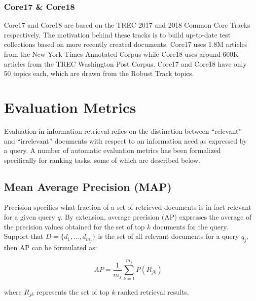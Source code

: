 \subsubsection{Core17 \& Core18}

Core17 and Core18 are based on the TREC 2017 and 2018 Common Core Tracks respectively.
The motivation behind these tracks is to build up-to-date test collections based on more recently created documents.
Core17 uses 1.8M articles from the New York Times Annotated Corpus
while Core18 uses around 600K articles from the TREC Washington Post Corpus.
Core17 and Core18 have only 50 topics each, which are drawn from the Robust Track topics.

\section{Evaluation Metrics}

Evaluation in information retrieval relies on the distinction between ``relevant'' and ``irrelevant'' documents with respect to an information need as expressed by a query.
A number of automatic evaluation metrics has been formalized specifically for ranking tasks, some of which are described below.


\subsection{Mean Average Precision (MAP)}

Precision specifies what fraction of a set of retrieved documents is in fact relevant for a given query $ q $.
By extension, average precision (AP) expresses the average of the precision values obtained for the set of top $ k $ documents for the query.
Support that $ D = \{d_1, ..., d_{m_j}\} $ is the set of all relevant documents for a query $ q_j $, then AP can be formulated as:

\begin{equation}
AP = \frac{1}{m_j} \sum^{m_j} _{k = 1} P(R_{jk})
\end{equation}

where $ R_{jk} $ represents the set of top $ k $ ranked retrieval results.

